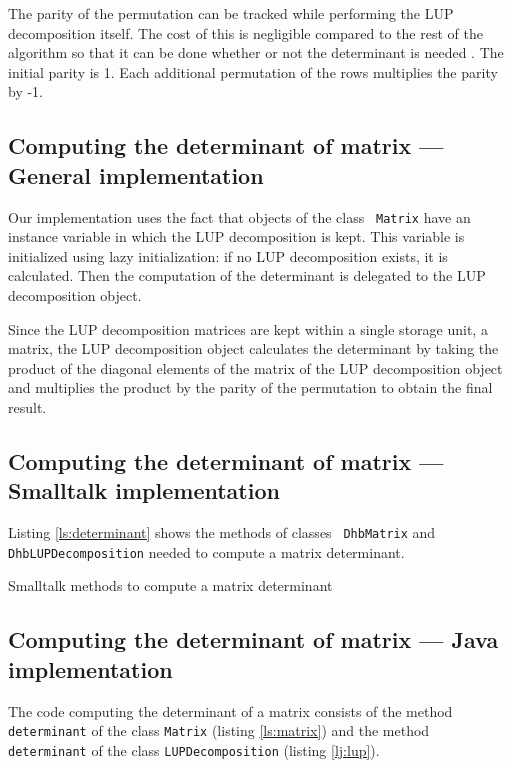 \documentclass[twoside]{book}
\begin{document}
The parity of the permutation can be tracked while performing the
LUP decomposition itself. The cost of this is negligible compared
to the rest of the algorithm so that it can be done whether or not
the determinant is needed . The initial parity is 1. Each
additional permutation of the rows multiplies the parity by -1.

\subsection{Computing the determinant of matrix --- General implementation}
Our implementation uses the fact that objects of the class {\tt
Matrix} have an instance variable in which the LUP decomposition
is kept. This variable is initialized using lazy initialization:
if no LUP decomposition exists, it is calculated. Then the
computation of the determinant is delegated to the LUP
decomposition object.

Since the LUP decomposition matrices are kept within a single
storage unit, a matrix, the LUP decomposition object calculates
the determinant by taking the product of the diagonal elements of
the matrix of the LUP decomposition object and multiplies the
product by the parity of the permutation to obtain the final
result.

\subsection{Computing the determinant of matrix --- Smalltalk implementation}
Listing \ref{ls:determinant} shows the methods of classes {\tt
DhbMatrix} and {\tt DhbLUPDecomposition} needed to compute a
matrix determinant.

\begin{listing} Smalltalk methods to compute a matrix determinant \label{ls:determinant}


\end{listing}


\subsection{Computing the determinant of matrix --- Java implementation}
The code computing the determinant of a matrix consists of the
method {\tt determinant} of the class {\tt Matrix} (\cf listing
\ref{ls:matrix}) and the method {\tt determinant} of the class
{\tt LUPDecomposition} (\cf listing \ref{lj:lup}).
\end{document}
